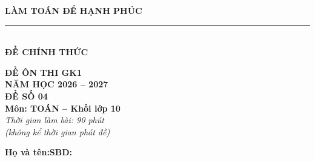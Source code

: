 \documentclass[12pt,a4paper]{article}
\begin{document}
\noindent
\begin{minipage}[c]{0.38\textwidth}
    \centering
    \textbf{LÀM TOÁN ĐỂ HẠNH PHÚC}\\[-2pt]
    \rule{3.2cm}{0.6pt}\\[4pt]
    \textbf{ĐỀ CHÍNH THỨC}
\end{minipage}\hfill
\begin{minipage}[c]{0.35\textwidth}
    \centering
    \textbf{ĐỀ ÔN THI GK1}\\
    \textbf{NĂM HỌC 2026 -- 2027}\\[2pt]
    \textbf{ĐỀ SỐ 04}\\
    \textbf{Môn: TOÁN -- Khối lớp 10}\\
    \textit{\small Thời gian làm bài: 90 phút\\(không kể thời gian phát đề)}
\end{minipage}

\vspace{0.2cm}
\noindent
\begin{minipage}[b]{0.78\textwidth}
    \textbf{Họ và tên:}\dotfill\textbf{SBD:}\makebox[3.5cm]{\dotfill}
\end{minipage}\hfill
\begin{minipage}[b]{0.20\textwidth}
    \hfill
    \setlength{\fboxrule}{0.8pt}%
\end{minipage}
\vspace{0.2cm}
\end{document}
